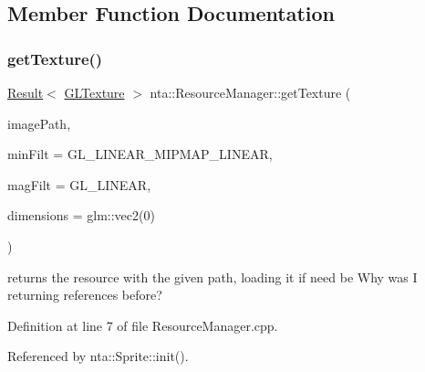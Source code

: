 \subsection{Member Function Documentation}
\mbox{\label{classnta_1_1ResourceManager_a60911bfeef0df3802c6ef03cc10fb5c1}} 
\subsubsection{\texorpdfstring{get\+Texture()}{getTexture()}}
{\footnotesize\ttfamily \hyperlink{classnta_1_1Result}{Result}$<$ \hyperlink{structnta_1_1GLTexture}{G\+L\+Texture} $>$ nta\+::\+Resource\+Manager\+::get\+Texture (\begin{DoxyParamCaption}\item[{crstring}]{image\+Path,  }\item[{G\+Lint}]{min\+Filt = {\ttfamily GL\+\_\+LINEAR\+\_\+MIPMAP\+\_\+LINEAR},  }\item[{G\+Lint}]{mag\+Filt = {\ttfamily GL\+\_\+LINEAR},  }\item[{crvec2}]{dimensions = {\ttfamily glm\+:\+:vec2(0)} }\end{DoxyParamCaption})\hspace{0.3cm}{\ttfamily [static]}}

returns the resource with the given path, loading it if need be  Why was I returning references before? 

Definition at line 7 of file Resource\+Manager.\+cpp.



Referenced by nta\+::\+Sprite\+::init().

